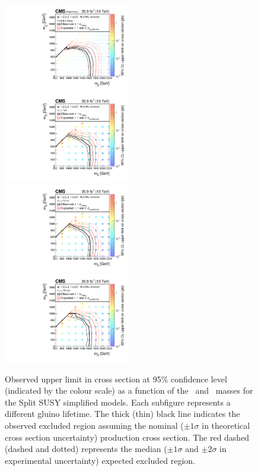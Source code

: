\clearpage
\begin{figure}[!t]
\centering
\includegraphics[width=0.49\textwidth]{figs/results/T1qqqqLLPromptXSEC}~
\includegraphics[width=0.49\textwidth]{figs/results/T1qqqqLL0p001XSEC}\\
\includegraphics[width=0.49\textwidth]{figs/results/T1qqqqLL0p01XSEC}~
\includegraphics[width=0.49\textwidth]{figs/results/T1qqqqLL0p1XSEC}
\caption{Observed upper limit in cross section at 95\% confidence level 
(indicated by the colour scale) as a function of the \gluino~and 
\neutralino~masses for the Split SUSY simplified models. Each subfigure 
represents a different gluino lifetime. The thick (thin) black line indicates 
the observed excluded region assuming the nominal ($\pm1\sigma$ in theoretical 
cross section uncertainty) production cross section. The red dashed (dashed and 
dotted) represents the median ($\pm1\sigma$ and $\pm2\sigma$ in experimental 
uncertainty) expected excluded region.}
\label{fig:limits-individual-1}
\end{figure}
